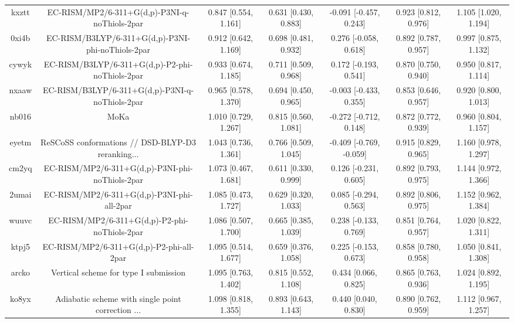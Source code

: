 \documentclass{article}
\begin{document}
\begin{center}
\begin{longtable}{|ccccccc|}
 kxztt &      EC-RISM/MP2/6-311+G(d,p)-P3NI-q-noThiols-2par &  0.847 [0.554, 1.161] &  0.631 [0.430, 0.883] &   -0.091 [-0.457, 0.243] &  0.923 [0.812, 0.976] &   1.105 [1.020, 1.194] \\
 0xi4b &  EC-RISM/B3LYP/6-311+G(d,p)-P3NI-phi-noThiols-2par &  0.912 [0.642, 1.169] &  0.698 [0.481, 0.932] &    0.276 [-0.058, 0.618] &  0.892 [0.787, 0.957] &   0.997 [0.875, 1.132] \\
 cywyk &    EC-RISM/B3LYP/6-311+G(d,p)-P2-phi-noThiols-2par &  0.933 [0.674, 1.185] &  0.711 [0.509, 0.968] &    0.172 [-0.193, 0.541] &  0.870 [0.750, 0.940] &   0.950 [0.817, 1.114] \\
 nxaaw &    EC-RISM/B3LYP/6-311+G(d,p)-P3NI-q-noThiols-2par &  0.965 [0.578, 1.370] &  0.694 [0.450, 0.965] &   -0.003 [-0.433, 0.355] &  0.853 [0.646, 0.957] &   0.920 [0.800, 1.013] \\
 nb016 &                                               MoKa &  1.010 [0.729, 1.267] &  0.815 [0.560, 1.081] &   -0.272 [-0.712, 0.148] &  0.872 [0.772, 0.939] &   0.960 [0.804, 1.157] \\
 eyetm &  ReSCoSS conformations // DSD-BLYP-D3 reranking... &  1.043 [0.736, 1.361] &  0.766 [0.509, 1.045] &  -0.409 [-0.769, -0.059] &  0.915 [0.829, 0.965] &   1.160 [0.978, 1.297] \\
 cm2yq &    EC-RISM/MP2/6-311+G(d,p)-P3NI-phi-noThiols-2par &  1.073 [0.467, 1.681] &  0.611 [0.330, 0.999] &    0.126 [-0.231, 0.605] &  0.892 [0.793, 0.975] &   1.144 [0.972, 1.366] \\
 2umai &         EC-RISM/MP2/6-311+G(d,p)-P3NI-phi-all-2par &  1.085 [0.473, 1.727] &  0.629 [0.320, 1.033] &    0.085 [-0.294, 0.563] &  0.892 [0.806, 0.975] &   1.152 [0.962, 1.384] \\
 wuuvc &      EC-RISM/MP2/6-311+G(d,p)-P2-phi-noThiols-2par &  1.086 [0.507, 1.700] &  0.665 [0.385, 1.039] &    0.238 [-0.133, 0.769] &  0.851 [0.764, 0.957] &   1.020 [0.822, 1.311] \\
 ktpj5 &           EC-RISM/MP2/6-311+G(d,p)-P2-phi-all-2par &  1.095 [0.514, 1.677] &  0.659 [0.376, 1.058] &    0.225 [-0.153, 0.673] &  0.858 [0.780, 0.958] &   1.050 [0.841, 1.308] \\
 arcko &              Vertical scheme for type I submission &  1.095 [0.763, 1.402] &  0.815 [0.552, 1.108] &     0.434 [0.066, 0.825] &  0.865 [0.763, 0.936] &   1.024 [0.892, 1.195] \\
 ko8yx &  Adiabatic scheme with single point correction ... &  1.098 [0.818, 1.355] &  0.893 [0.643, 1.143] &     0.440 [0.040, 0.830] &  0.890 [0.762, 0.959] &   1.112 [0.967, 1.257] \\

\end{longtable}
\end{center}
\end{document}
